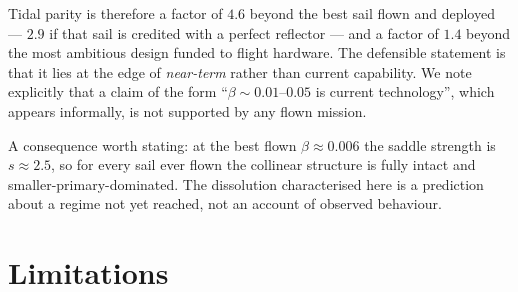\documentclass[pdflatex,sn-mathphys-num]{sn-jnl}
\begin{document}
Tidal parity is therefore a factor of $4.6$ beyond the best sail flown and
deployed --- $2.9$ if that sail is credited with a perfect reflector --- and a
factor of $1.4$ beyond the most ambitious design funded to flight hardware.
The defensible statement is that it lies at the edge of \emph{near-term} rather
than current capability. We note explicitly that a claim of the form
``$\beta\sim0.01$--$0.05$ is current technology'', which appears informally, is
not supported by any flown mission.

A consequence worth stating: at the best flown $\beta\approx0.006$ the saddle
strength is $s\approx2.5$, so for every sail ever flown the collinear structure
is fully intact and smaller-primary-dominated. The dissolution characterised
here is a prediction about a regime not yet reached, not an account of observed
behaviour.

\section{Limitations}\label{sec:limits}
\end{document}
